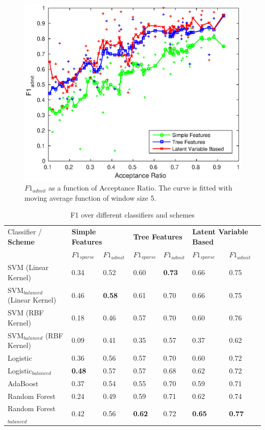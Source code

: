 \documentclass{sig-alternate-05-2015}
\begin{document}
\begin{figure}[h]
\centering
\includegraphics[scale=0.6]{acceptance_ratio_vs_simple_tree_em.eps}
\caption{$F1_{admit}$ as a function of Acceptance Ratio.
The curve is fitted with moving average function of window size 5.}
\label{fig:acceptance_simple_tree_em}
\end{figure}


\begin{table}[t]
\centering
\caption{F1 over different classifiers and schemes}
\label{tab:all-f1}
\begin{tabular}{|l|l l|l l|l l|}
\hline
Classifier / \textbf{Scheme} & \multicolumn{2}{l|}{\textbf{Simple Features}} & \multicolumn{2}{l|}{\textbf{Tree Features}} & \multicolumn{2}{l|}{\textbf{Latent Variable Based}} \\
 & $F1_{sparse}$ & $F1_{admit}$ & $F1_{sparse}$ & $F1_{admit}$ & $F1_{sparse}$ & $F1_{admit}$ \\ \hline
SVM (Linear Kernel) 				& 0.34 & 0.52 & 0.60 & \textbf{0.73} & 0.66 & 0.75 \\ \hline
SVM$_{balanced}$ (Linear Kernel)	& 0.46 & \textbf{0.58} & 0.61 & 0.70 & 0.66 & 0.75 \\ \hline
SVM (RBF Kernel) 					& 0.18 & 0.46 & 0.57 & 0.70 & 0.60 & 0.76 \\ \hline
SVM$_{balanced}$ (RBF Kernel) 		& 0.09 & 0.41 & 0.35 & 0.57 & 0.37 & 0.62 \\ \hline
Logistic 							& 0.36 & 0.56 & 0.57 & 0.70 & 0.60 & 0.72 \\ \hline
Logistic$_{balanced}$ 				& \textbf{0.48} & 0.57 & 0.57 & 0.68 & 0.62 & 0.72 \\ \hline
AdaBoost 							& 0.37 & 0.54 & 0.55 & 0.70 & 0.59 & 0.71 \\ \hline
Random Forest 						& 0.24 & 0.49 & 0.59 & 0.71 & 0.62 & 0.74 \\ \hline
Random Forest$_{balanced}$ 			& 0.42 & 0.56 & \textbf{0.62} & 0.72 & \textbf{0.65} & \textbf{0.77} \\ \hline
\end{tabular}
\end{table}
\end{document}
